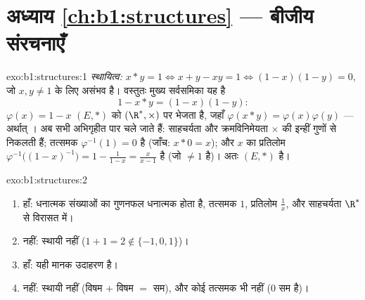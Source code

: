 \section*{अध्याय \ref{ch:b1:structures} --- बीजीय संरचनाएँ}

\begin{solution}{exo:b1:structures:1}
\emph{स्थायित्व:} $x * y = 1 \iff x + y - xy = 1 \iff (1-x)(1-y) = 0$, जो
$x, y \neq 1$ के लिए असंभव है। वस्तुतः मुख्य सर्वसमिका यह है
\[
1 - x * y = (1 - x)(1 - y):
\]
 $\varphi(x) = 1 - x$ $(E, *)$ को $(\R^*, \times)$ पर भेजता है,
जहाँ $\varphi(x * y) = \varphi(x)\varphi(y)$ --- अर्थात् 
। अब सभी अभिगृहीत पार चले जाते हैं: साहचर्यता और क्रमविनिमेयता
$\times$ की इन्हीं गुणों से निकलती हैं; तत्समक $\varphi^{-1}(1) = 0$ है
(जाँच: $x * 0 = x$); और $x$ का प्रतिलोम $\varphi^{-1}\bigl((1-x)^{-1}\bigr)
= 1 - \frac{1}{1-x} = \frac{x}{x - 1}$ है (जो $\neq 1$ है)। अतः $(E, *)$
 है।
\end{solution}

\begin{solution}{exo:b1:structures:2}
\begin{enumerate}
  \item हाँ: धनात्मक संख्याओं का गुणनफल धनात्मक होता है, तत्समक $1$,
  प्रतिलोम $\frac 1x$, और साहचर्यता $\R^*$ से विरासत में।
  \item नहीं: स्थायी नहीं ($1 + 1 = 2 \notin \{-1,0,1\}$)।
  \item हाँ: यही मानक उदाहरण है।
  \item नहीं: स्थायी नहीं (विषम $+$ विषम $=$ सम), और कोई तत्समक भी नहीं ($0$
  सम है)।
\end{enumerate}
\end{solution}

